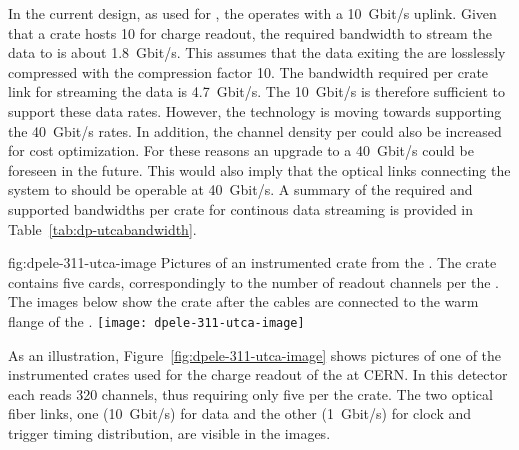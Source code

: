 In the current design, as used for , the  operates with a \SI{10}{Gbit/s} uplink. Given that a  crate hosts \num{10}  for charge readout, the required bandwidth to stream the data to  is about \SI{1.8}{Gbit/s}. This assumes that the data exiting the  are losslessly compressed with the compression factor \num{10}. The bandwidth required per crate link for streaming the  data is \SI{4.7}{Gbit/s}. The \SI{10}{Gbit/s}  is therefore sufficient to support these data rates. However, the technology is moving towards supporting the \SI{40}{Gbit/s} rates. In addition, the channel density per  could also be increased for cost optimization. For these reasons an upgrade to a \SI{40}{Gbit/s}  could be foreseen in the future. This would also imply that the optical links connecting the  system to   should be operable at \SI{40}{Gbit/s}. A summary of the required and supported bandwidths per  crate for continous data streaming is provided in Table~\ref{tab:dp-utcabandwidth}.

\begin{dunefigure}{fig:dpele-311-utca-image}
{Pictures of an instrumented  crate from the . The crate contains five  cards, correspondingly to the number of readout channels per the . The images below show the crate after the  cables are connected to the warm flange of the .}
\texttt{[image: dpele-311-utca-image]}
\end{dunefigure}

As an illustration, Figure~\ref{fig:dpele-311-utca-image} shows pictures of one of the instrumented  crates used for the charge readout of the  at CERN. In this detector each  reads \num{320} channels, thus requiring only five  per the  crate. The two optical fiber links, one (\SI{10}{Gbit/s}) for data and the other (\SI{1}{Gbit/s}) for clock and trigger timing distribution, are visible in the images.       

